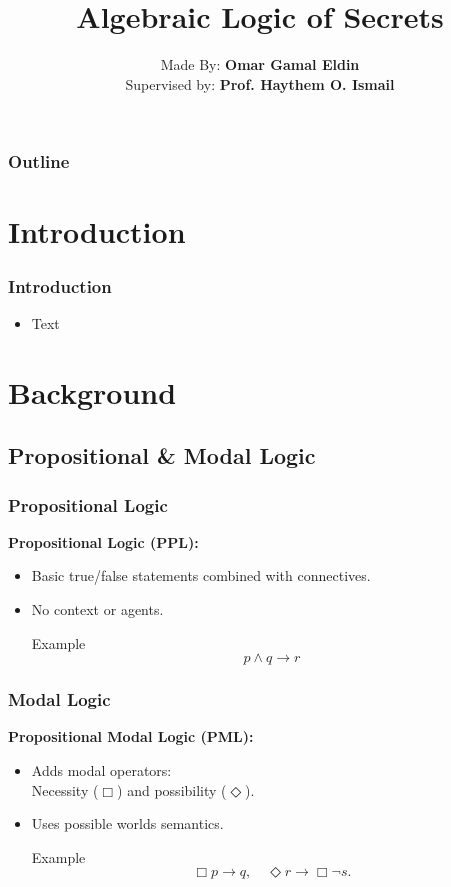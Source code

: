 \documentclass[aspectratio=169]{beamer}
\title{\Huge \textbf{Algebraic Logic of Secrets}}
\author{Made By: \textbf{Omar Gamal Eldin}\\Supervised by: \textbf{Prof. Haythem O. Ismail}}
\institute{}
\date{}
\begin{document}
\frame{\titlepage}


\begin{frame}
\frametitle{Outline}
\tableofcontents[hideallsubsections]
\end{frame}


\section{Introduction}

\begin{frame}
\frametitle{Introduction}
\begin{itemize}
    \item Text
\end{itemize}
\end{frame}


\section{Background}

\subsection{Propositional \& Modal Logic}
\begin{frame}
\frametitle{Propositional Logic}
    \Large 
    \textbf{Propositional Logic (PPL):}
    \begin{itemize}
        \item Basic true/false statements combined with connectives.
        \item No context or agents.
        \begin{block}{Example}
            \[
            p \wedge q \rightarrow r
            \]
        \end{block}
    \end{itemize}
\end{frame}

\begin{frame}
\frametitle{Modal Logic}
    \Large 
    \textbf{Propositional Modal Logic (PML):}
    \begin{itemize}
        \item Adds modal operators: \\
        Necessity ($\Box$) and possibility ($\Diamond$).
        \item Uses possible worlds semantics.
        \begin{block}{Example}
            \[
            \Box p \rightarrow q, \quad
            \Diamond r \rightarrow \Box \neg s.
            \]
        \end{block}
    \end{itemize}
\end{frame}
\end{document}
